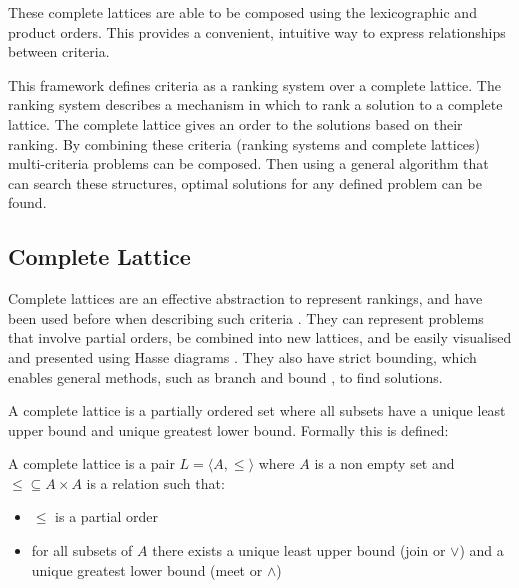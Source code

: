 These complete lattices are able to be composed using the lexicographic and product orders.
This provides a convenient, intuitive way to express relationships between criteria.

This framework defines criteria as a ranking system over a complete lattice.
The ranking system describes a mechanism in which to rank a solution to a complete lattice. 
The complete lattice gives an order to the solutions based on their ranking.
By combining these criteria (ranking systems and complete lattices) multi-criteria problems can be composed.
Then using a general algorithm that can search these structures, 
optimal solutions for any defined problem can be found.

\subsection{Complete Lattice}
Complete lattices are an effective abstraction to represent rankings,
and have been used before when describing such criteria \cite{Bistarelli1997,Fernandez}.
They can represent problems that involve partial orders,
be combined into new lattices,
and be easily visualised and presented using Hasse diagrams \cite{davey1990introduction}.
They also have strict bounding, which enables general methods, such as branch and bound \cite{Land1960}, to find solutions.

A complete lattice is a partially ordered set where all subsets have a unique least upper bound and unique greatest lower bound.
Formally this is defined:
\begin{defs}
A complete lattice is a pair $L = \langle A, \leq \rangle$ where $A$ is a non empty set 
and $\leq \subseteq A \times A$ is a relation such that:
\begin{itemize}
  \item $\leq$ is a partial order
  \item for all subsets of $A$ there exists a unique least upper bound (join or $\vee$) and a unique greatest lower bound (meet or $\wedge$)
\end{itemize}
\end{defs}

